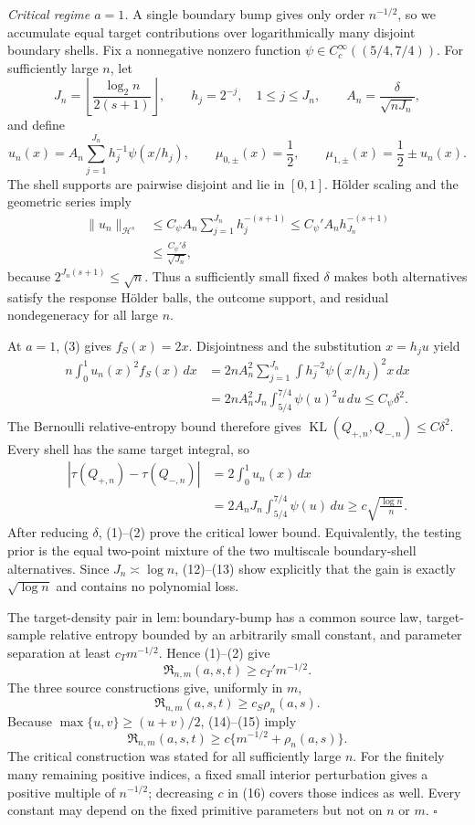 \emph{Critical regime \(a=1\).}
A single boundary bump gives only order \(n^{-1/2}\), so we accumulate equal target contributions over logarithmically many disjoint boundary shells.  Fix a nonnegative nonzero function
\(\psi\in C_c^\infty((5/4,7/4))\).  For sufficiently large \(n\), let
\[
 J_n=\left\lfloor\frac{\log_2 n}{2(s+1)}\right\rfloor,
 \qquad h_j=2^{-j},\quad 1\le j\le J_n,
 \qquad A_n=\frac{\delta}{\sqrt{nJ_n}},
\tag{9}
\]
and define
\[
 u_n(x)=A_n\sum_{j=1}^{J_n}h_j^{-1}\psi(x/h_j),
 \qquad
 \mu_{0,\pm}(x)=\frac12,
 \qquad
 \mu_{1,\pm}(x)=\frac12\pm u_n(x).
\tag{10}
\]
The shell supports are pairwise disjoint and lie in \([0,1]\).  H\"older scaling and the geometric series imply
\[
\begin{aligned}
 \lVert u_n\rVert_{\mathcal H^s}
 &\le C_\psi A_n\sum_{j=1}^{J_n}h_j^{-(s+1)}
 \le C_\psi' A_nh_{J_n}^{-(s+1)}\\
 &\le \frac{C_\psi'\delta}{\sqrt{J_n}},
\end{aligned}
\tag{11}
\]
because \(2^{J_n(s+1)}\le\sqrt n\).  Thus a sufficiently small fixed \(\delta\) makes both alternatives satisfy the response H\"older balls, the outcome support, and residual nondegeneracy for all large \(n\).

At \(a=1\), (3) gives \(f_S(x)=2x\).  Disjointness and the substitution \(x=h_ju\) yield
\[
\begin{aligned}
 n\int_0^1u_n(x)^2f_S(x)\,dx
 &=2nA_n^2\sum_{j=1}^{J_n}
   \int h_j^{-2}\psi(x/h_j)^2x\,dx\\
 &=2nA_n^2J_n\int_{5/4}^{7/4}\psi(u)^2u\,du
 \le C_\psi\delta^2.
\end{aligned}
\tag{12}
\]
The Bernoulli relative-entropy bound therefore gives
\(\operatorname{KL}(Q_{+,n},Q_{-,n})\le C\delta^2\).  Every shell has the same target integral, so
\[
\begin{aligned}
 |\tau(Q_{+,n})-\tau(Q_{-,n})|
 &=2\int_0^1u_n(x)\,dx\\
 &=2A_nJ_n\int_{5/4}^{7/4}\psi(u)\,du
 \ge c\sqrt{\frac{\log n}{n}}.
\end{aligned}
\tag{13}
\]
After reducing \(\delta\), (1)--(2) prove the critical lower bound.  Equivalently, the testing prior is the equal two-point mixture of the two multiscale boundary-shell alternatives.  Since \(J_n\asymp\log n\), (12)--(13) show explicitly that the gain is exactly \(\sqrt{\log n}\) and contains no polynomial loss.

The target-density pair in \(\mathrm{lem:boundary\text{-}bump}\) has a common source law, target-sample relative entropy bounded by an arbitrarily small constant, and parameter separation at least \(c_Tm^{-1/2}\).  Hence (1)--(2) give
\[
 \mathfrak R_{n,m}(a,s,t)\ge c_T'm^{-1/2}.
\tag{14}
\]
The three source constructions give, uniformly in \(m\),
\[
 \mathfrak R_{n,m}(a,s,t)\ge c_S\rho_n(a,s).
\tag{15}
\]
Because \(\max\{u,v\}\ge(u+v)/2\), (14)--(15) imply
\[
 \mathfrak R_{n,m}(a,s,t)
 \ge c\{m^{-1/2}+\rho_n(a,s)\}.
\tag{16}
\]
The critical construction was stated for all sufficiently large \(n\).  For the finitely many remaining positive indices, a fixed small interior perturbation gives a positive multiple of \(n^{-1/2}\); decreasing \(c\) in (16) covers those indices as well.  Every constant may depend on the fixed primitive parameters but not on \(n\) or \(m\). \(\square\)